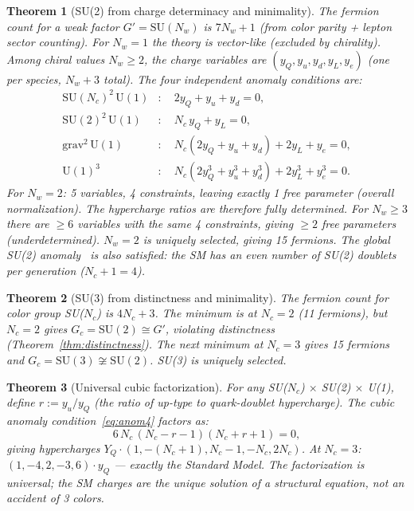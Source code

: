 \documentclass[12pt,a4paper]{article}
\newtheorem{theorem}{Theorem}
\begin{document}
\begin{theorem}[SU(2) from charge determinacy and minimality]
\label{thm:su2}
The fermion count for a weak factor $G' = \mathrm{SU}(N_w)$ is $7N_w + 1$ (from color parity + lepton sector counting). For $N_w = 1$ the theory is vector-like (excluded by chirality). Among chiral values $N_w \geq 2$, the charge variables are $(y_Q, y_u, y_d, y_L, y_e)$ (one per species, $N_w + 3$ total). The four independent anomaly conditions are:
\begin{align}
\mathrm{SU}(N_c)^2 \,\mathrm{U}(1) &: \quad 2y_Q + y_u + y_d = 0, \label{eq:anom1} \\
\mathrm{SU}(2)^2 \,\mathrm{U}(1) &: \quad N_c\, y_Q + y_L = 0, \label{eq:anom2} \\
\mathrm{grav}^2 \,\mathrm{U}(1) &: \quad N_c(2y_Q + y_u + y_d) + 2y_L + y_e = 0, \label{eq:anom3} \\
\mathrm{U}(1)^3 &: \quad N_c(2y_Q^3 + y_u^3 + y_d^3) + 2y_L^3 + y_e^3 = 0. \label{eq:anom4}
\end{align}
For $N_w = 2$: 5 variables, 4 constraints, leaving exactly 1 free parameter (overall normalization). The hypercharge ratios are therefore fully determined. For $N_w \geq 3$ there are $\geq 6$ variables with the same 4 constraints, giving $\geq 2$ free parameters (underdetermined). $N_w = 2$ is uniquely selected, giving 15 fermions. The global SU(2) anomaly~\cite{witten_su2} is also satisfied: the SM has an even number of SU(2) doublets per generation ($N_c + 1 = 4$).
\end{theorem}

\begin{theorem}[SU(3) from distinctness and minimality]
\label{thm:su3}
The fermion count for color group SU($N_c$) is $4N_c + 3$. The minimum is at $N_c = 2$ (11 fermions), but $N_c = 2$ gives $G_c = \mathrm{SU}(2) \cong G'$, violating distinctness (Theorem~\ref{thm:distinctness}). The next minimum at $N_c = 3$ gives 15 fermions and $G_c = \mathrm{SU}(3) \not\cong \mathrm{SU}(2)$. SU(3) is uniquely selected.
\end{theorem}

\begin{theorem}[Universal cubic factorization]
\label{thm:universal_cubic}
For any SU($N_c$) $\times$ SU(2) $\times$ U(1), define $r := y_u / y_Q$ (the ratio of up-type to quark-doublet hypercharge). The cubic anomaly condition~\eqref{eq:anom4} factors as:
\[
6\,N_c\,(N_c - r - 1)(N_c + r + 1) = 0,
\]
giving hypercharges $Y_Q \cdot (1, -(N_c+1), N_c - 1, -N_c, 2N_c)$. At $N_c = 3$: $(1, -4, 2, -3, 6) \cdot y_Q$ --- exactly the Standard Model. The factorization is universal; the SM charges are the unique solution of a structural equation, not an accident of 3 colors.
\end{theorem}
\end{document}
